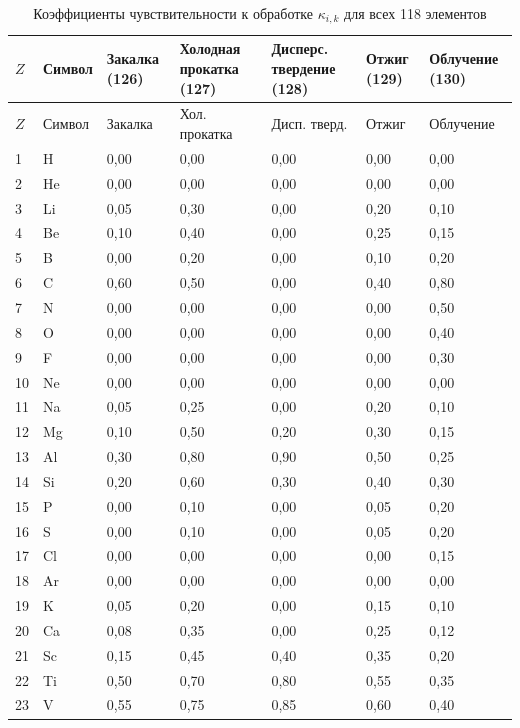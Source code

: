 \documentclass[12pt,a4paper]{article}
\begin{document}
	\begin{longtable}{p{2.2cm}p{1.2cm}p{2.2cm}p{2.2cm}p{2.2cm}p{2.2cm}p{2.2cm}}
		\caption{Коэффициенты чувствительности к обработке \(\kappa_{i,k}\) для всех 118 элементов} \label{tab:kappa-ik-full} \\
		\toprule
		\(Z\) & Символ & Закалка (126) & Холодная прокатка (127) & Дисперс. твердение (128) & Отжиг (129) & Облучение (130) \\
		\midrule
		\endfirsthead
		\toprule
		\(Z\) & Символ & Закалка & Хол. прокатка & Дисп. тверд. & Отжиг & Облучение \\
		\midrule
		\endhead
		1  & H   & 0,00 & 0,00 & 0,00 & 0,00 & 0,00 \\
		2  & He  & 0,00 & 0,00 & 0,00 & 0,00 & 0,00 \\
		3  & Li  & 0,05 & 0,30 & 0,00 & 0,20 & 0,10 \\
		4  & Be  & 0,10 & 0,40 & 0,00 & 0,25 & 0,15 \\
		5  & B   & 0,00 & 0,20 & 0,00 & 0,10 & 0,20 \\
		6  & C   & 0,60 & 0,50 & 0,00 & 0,40 & 0,80 \\
		7  & N   & 0,00 & 0,00 & 0,00 & 0,00 & 0,50 \\
		8  & O   & 0,00 & 0,00 & 0,00 & 0,00 & 0,40 \\
		9  & F   & 0,00 & 0,00 & 0,00 & 0,00 & 0,30 \\
		10 & Ne  & 0,00 & 0,00 & 0,00 & 0,00 & 0,00 \\
		11 & Na  & 0,05 & 0,25 & 0,00 & 0,20 & 0,10 \\
		12 & Mg  & 0,10 & 0,50 & 0,20 & 0,30 & 0,15 \\
		13 & Al  & 0,30 & 0,80 & 0,90 & 0,50 & 0,25 \\
		14 & Si  & 0,20 & 0,60 & 0,30 & 0,40 & 0,30 \\
		15 & P   & 0,00 & 0,10 & 0,00 & 0,05 & 0,20 \\
		16 & S   & 0,00 & 0,10 & 0,00 & 0,05 & 0,20 \\
		17 & Cl  & 0,00 & 0,00 & 0,00 & 0,00 & 0,15 \\
		18 & Ar  & 0,00 & 0,00 & 0,00 & 0,00 & 0,00 \\
		19 & K   & 0,05 & 0,20 & 0,00 & 0,15 & 0,10 \\
		20 & Ca  & 0,08 & 0,35 & 0,00 & 0,25 & 0,12 \\
		21 & Sc  & 0,15 & 0,45 & 0,40 & 0,35 & 0,20 \\
		22 & Ti  & 0,50 & 0,70 & 0,80 & 0,55 & 0,35 \\
		23 & V   & 0,55 & 0,75 & 0,85 & 0,60 & 0,40 \\

\end{longtable}
\end{document}
